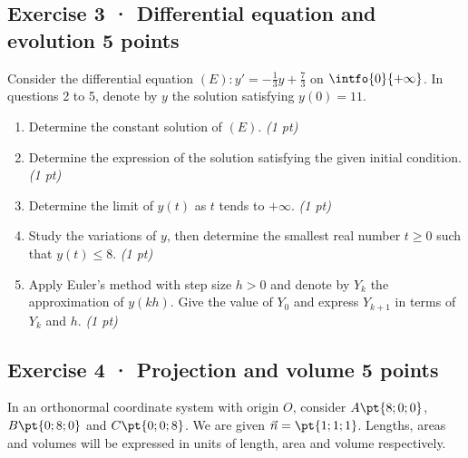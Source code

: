 \mxnewpage{}

\subsection*{Exercise 3 · Differential equation and evolution \hfill 5 points}Consider the differential equation $(E):y'=-\frac1{3}y+\frac{7}{3}$ on $\intfo{0}{+\infty}$. In questions 2 to 5, denote by $y$ the solution satisfying $y(0)=11$.

\begin{enumerate}

\item Determine the constant solution of $(E)$. \hfill\textit{(1 pt)}

\item Determine the expression of the solution satisfying the given initial condition. \hfill\textit{(1 pt)}

\item Determine the limit of $y(t)$ as $t$ tends to $+\infty$. \hfill\textit{(1 pt)}

\item Study the variations of $y$, then determine the smallest real number $t\ge0$ such that $y(t)\le8$. \hfill\textit{(1 pt)}

\item Apply Euler's method with step size $h>0$ and denote by $Y_k$ the approximation of $y(kh)$. Give the value of $Y_0$ and express $Y_{k+1}$ in terms of $Y_k$ and $h$. \hfill\textit{(1 pt)}

\end{enumerate}

\subsection*{Exercise 4 · Projection and volume \hfill 5 points}In an orthonormal coordinate system with origin $O$, consider $A\pt{8;0;0}$, $B\pt{0;8;0}$ and $C\pt{0;0;8}$. We are given $\vec n=\pt{1;1;1}$. Lengths, areas and volumes will be expressed in units of length, area and volume respectively.

